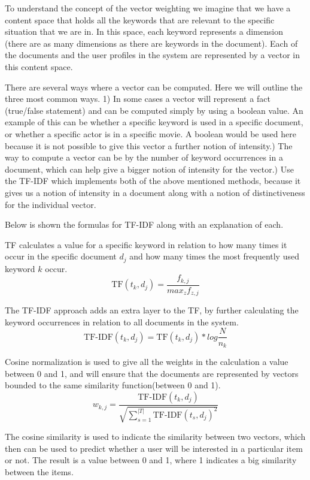 To understand the concept of the vector weighting we imagine that we have a content space that holds all the keywords that are relevant to the specific situation that we are in. In this space, each keyword represents a dimension (there are as many dimensions as there are keywords in the document). Each of the documents and the user profiles in the system are represented by a vector in this content space.

There are several ways where a vector can be computed. Here we will outline the three most common ways.
1) In some cases a vector will represent a fact (true/false statement) and can be computed simply by using a boolean value. An example of this can be whether a specific keyword is used in a specific document, or whether a specific actor is in a specific movie. A boolean would be used here because it is not possible to give this vector a further notion of intensity.) The way to compute a vector can be by the number of keyword occurrences in a document, which can help give a bigger notion of intensity for the vector.) Use the TF-IDF which implements both of the above mentioned methods, because it gives us a notion of intensity in a document along with a notion of distinctiveness for the individual vector.\newline

Below is shown the formulas for TF-IDF along with an explanation of each.

TF calculates a value for a specific keyword in relation to how many times it occur in the specific document \(d_{j}\) and how many times the most frequently used keyword \(k\) occur.
\[
	\text{TF}(t_{k},d_{j}) = \frac{f_{k,j}}{max_{z}f_{z,j}}
\]

The TF-IDF approach adds an extra layer to the TF, by further calculating the keyword occurrences in relation to all documents in the system.
\[
	\text{TF-IDF}(t_{k},d_{j}) = \text{TF}(t_{k},d_{j}) * log{\frac{N}{n_{k}}}
\]

Cosine normalization is used to give all the weights in the calculation a value between 0 and 1, and will ensure that the documents are represented by vectors bounded to the same similarity function(between 0 and 1).
\[
	w_{k,j} = \frac{\text{TF-IDF}(t_{k},d_{j})}{\sqrt{\sum_{s=1}^{|T|} \text{TF-IDF}(t_{s}, d_{j})^2}}
\]

The cosine similarity is used to indicate the similarity between two vectors, which then can be used to predict whether a user will be interested in a particular item or not. The result is a value between 0 and 1, where 1 indicates a big similarity between the items.

